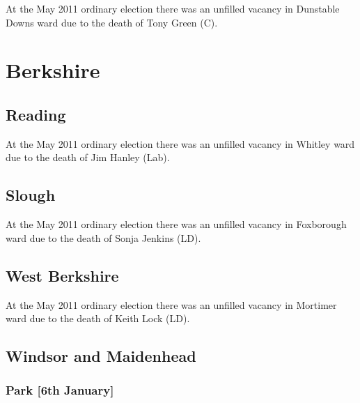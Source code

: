 \begin{resultsiii}
At the May 2011 ordinary election there was an unfilled vacancy in Dunstable Downs ward due to the death of Tony Green (C).

\section{Berkshire}

\subsection*{Reading}


At the May 2011 ordinary election there was an unfilled vacancy in Whitley ward due to the death of Jim Hanley (Lab).

\subsection*{Slough}


At the May 2011 ordinary election there was an unfilled vacancy in Foxborough ward due to the death of Sonja Jenkins (LD).

\subsection*{West Berkshire}


At the May 2011 ordinary election there was an unfilled vacancy in Mortimer ward due to the death of Keith Lock (LD).

\subsection*{Windsor and Maidenhead}

\subsubsection*{Park \hspace*{\fill}\nolinebreak[1]%
\enspace\hspace*{\fill}
[6th January]}



\end{resultsiii}
